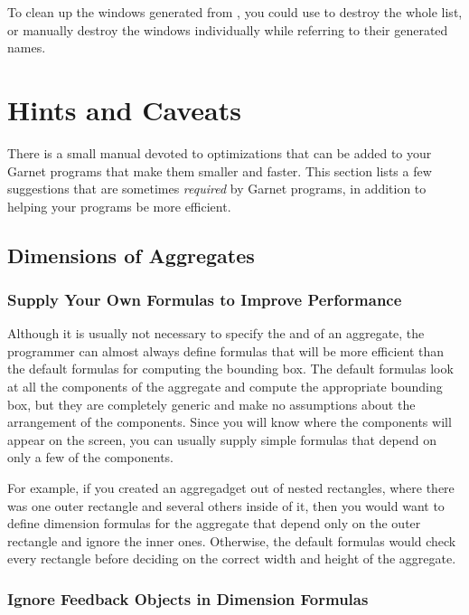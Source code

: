 To clean up the windows generated from , you could use
 to destroy the whole list, or manually destroy the windows
individually while referring to their generated names.



\chapter{Hints and Caveats}

There is a small manual devoted to optimizations that can be added to your
Garnet programs that make them smaller and faster.  This section lists a
few suggestions that are sometimes {\it required} by Garnet programs, in
addition to helping your programs be more efficient.


\section{Dimensions of Aggregates}

\subsection{Supply Your Own Formulas to Improve Performance}

Although it is usually not necessary to specify the  and
 of an aggregate, the programmer can almost always define
formulas that will be more efficient than the default formulas for
computing the bounding box.  The default formulas look at all the
components of the aggregate and compute the appropriate bounding box, but
they are completely generic and make no assumptions about the arrangement
of the components.  Since you will know where the components will
appear on the screen, you can usually supply simple formulas that
depend on only a few of the components.

For example, if you created an aggregadget out of nested rectangles,
where there was one outer rectangle and several others inside of it,
then you would want to define dimension formulas for the aggregate that
depend only on the outer rectangle and ignore the inner ones.
Otherwise, the default formulas would check every rectangle before
deciding on the correct width and height of the aggregate.


\subsection{Ignore Feedback Objects in Dimension Formulas}

